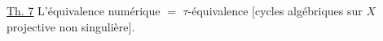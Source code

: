 

\uline{Th. 7} L'équivalence numérique $=$ $\tau$-équivalence [cycles algébriques sur $X$ projective non singulière].

